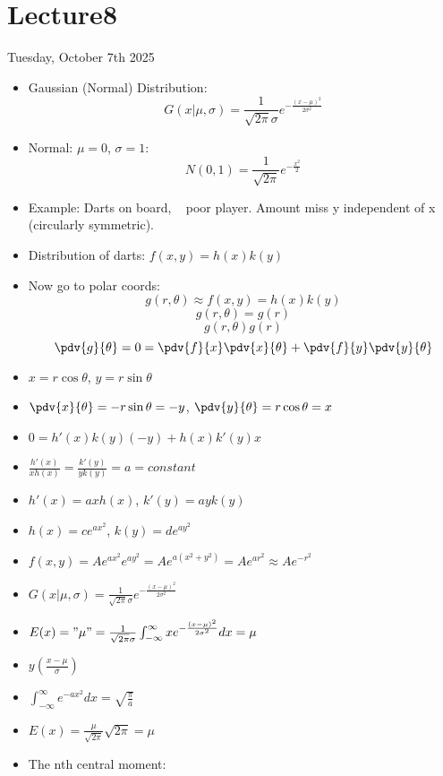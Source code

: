 \section{Lecture8}

Tuesday, October 7th 2025


\begin{itemize}
    \item Gaussian (Normal) Distribution:
          \[ G(x|\mu, \sigma) = \frac{1}{\sqrt{2 \pi} \sigma} e^{-\frac{(x - \mu)^2}{2 \sigma^2}} \]
    \item Normal: $\mu = 0$, $\sigma = 1$:
          \[ N(0,1) = \frac{1}{\sqrt{2 \pi}} e^{-\frac{x^2}{2}} \]
    \item Example: Darts on board, ~ poor player. Amount miss y independent of x (circularly symmetric).
    \item Distribution of darts: $f(x,y) = h(x) k(y)$
    \item Now go to polar coords:
          \[ g(r, \theta) \approx  f(x,y) = h(x) k(y) \]
          \[ g(r,\theta) = g(r) \]
          \[ g(r,\theta) g(r) \]
          \[ \pdv{g}{\theta} = 0 = \pdv{f}{x} \pdv{x}{\theta} + \pdv{f}{y} \pdv{y}{\theta} \]
    \item $x = r \cos{\theta}$, $y = r \sin{\theta}$
    \item $\pdv{x}{\theta} = -r \sin{\theta} = -y$, $\pdv{y}{\theta} = r \cos{\theta} = x$
    \item $ 0 = h'(x) k(y) (-y) + h(x) k'(y) x$
    \item $\frac{h'(x)}{x h(x)} = \frac{k'(y)}{y k(y)} = a = constant$
    \item $h'(x) = a x h(x)$, $k'(y) = a y k(y)$
    \item $h(x) = c e^{ax^2}$, $k(y) = d e^{ay^2}$
    \item $f(x,y) = A e^{ax^2} e^{ay^2} = A e^{a(x^2 + y^2)} = A e^{ar^2} \approx A e^{-r^2}$
    \item $G(x|\mu, \sigma) = \frac{1}{\sqrt{2 \pi} \sigma} e^{-\frac{(x - \mu)^2}{2 \sigma^2}}$
    \item $E(x) =  "\mu" = \frac{1}{\sqrt{2 \pi} \sigma} \int_{-\infty}^{\infty} x e^{-\frac{(x - \mu)^2}{2 \sigma^2}} dx = \mu$
    \item $y(\frac{x-\mu}{\sigma})$
    \item $\int_{-\infty}^{\infty} e^{-ax^2} dx = \sqrt{\frac{\pi}{a}}$
    \item $E(x) = \frac{\mu}{\sqrt{2 \pi}} \sqrt{2 \pi} = \mu$
    \item The nth central moment:

\end{itemize}
